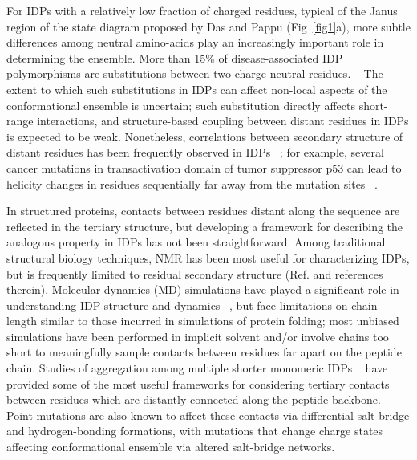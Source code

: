 \documentclass[journal=jacsat,manuscript=article]{achemso}
\begin{document}
For IDPs with a relatively low fraction of charged residues, typical of the Janus region of the state diagram proposed by Das and Pappu\cite{Das2015,Das2013a} (Fig~\ref{fig1}a), more subtle differences among neutral amino-acids  play an increasingly important role in determining the ensemble.  More than 15\% of disease-associated IDP polymorphisms are substitutions between two charge-neutral residues. ~\cite {Vacic2012a} The extent to which such substitutions in IDPs can affect non-local aspects of the conformational ensemble is uncertain;  such substitution directly affects short-range interactions, and structure-based coupling between distant residues in IDPs is expected to be weak.  Nonetheless, correlations between secondary structure of distant residues has been frequently observed in IDPs ~\cite{Ganguly2015,Iesmantavicius2013}; for example, several cancer mutations in transactivation domain of tumor suppressor p53 can lead to helicity changes in residues sequentially far away from the mutation sites ~\cite{Ganguly2015}.

In structured proteins, contacts between residues distant along the sequence are reflected in the tertiary structure, but developing a framework for describing the analogous property in IDPs has not been straightforward. Among traditional structural biology techniques, NMR has been most useful for characterizing IDPs, but is frequently limited to residual secondary structure (Ref. \cite{Mittag2007,Habchi2014} and references therein). Molecular dynamics (MD) simulations have played a significant role in understanding IDP structure and dynamics ~\cite{Stanley2015,Ithuralde2016,Knott2012b,Invernizzi2013,Abeln2008,Yedvabny2015}, but face limitations on chain length similar to those incurred in simulations of protein folding; most unbiased simulations have been performed in implicit solvent and/or involve chains too short to meaningfully sample contacts between residues far apart on the peptide chain.  Studies of aggregation among multiple shorter monomeric IDPs ~\cite{Levine2015,Pappu2008}  have provided some of the most useful frameworks for considering tertiary contacts between residues which are distantly connected along the peptide backbone.  Point mutations are also known to affect these contacts via differential salt-bridge and hydrogen-bonding formations, with mutations that change charge states affecting conformational ensemble via altered salt-bridge networks. ~\cite{Levine2015} 
\end{document}
